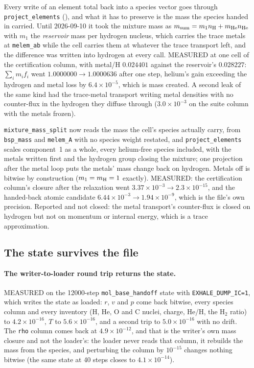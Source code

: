 \documentclass[english,a4paper]{my_memo}
\begin{document}
Every write of an element total back into a species vector goes through
\verb|project_elements| (), and what it
has to preserve is the mass the species handed in carried. Until 2026-09-10
it took the mixture mass as
$m_{\rm sum} = m_1 n_{\rm H} + m_{\rm He} n_{\rm He}$ with $m_1$ the
\emph{reservoir} mass per hydrogen nucleus, which carries the trace metals
at \verb|melem_ab| while the cell carries them at whatever the trace
transport left, and the difference was written into hydrogen at every call.
MEASURED at one cell of the certification column, with metal/H $0.024401$
against the reservoir's $0.028227$: $\sum_i m_i f_i$ went
$1.0000000 \to 1.0000636$ after one step, helium's gain exceeding the
hydrogen and metal loss by $6.4\times10^{-5}$, which is mass created. A
second leak of the same kind had the trace-metal transport writing metal densities
with no counter-flux in the hydrogen they diffuse through
($3.0\times10^{-3}$ on the suite column with the metals frozen).

\verb|mixture_mass_split| now reads the mass the cell's species actually
carry, from \verb|bsp_mass| and \verb|melem_A| with no species weight
restated, and \verb|project_elements| scales component~1 as a whole, every
helium-free species included, with the metals written first and the hydrogen
group closing the mixture; one projection after the metal loop puts the
metals' mass change back on hydrogen. Metals off is bitwise by construction
($m_1 = m_{\rm H} = 1$ exactly). MEASURED: the certification column's
closure after the relaxation went $3.37\times10^{-3} \to 2.3\times10^{-15}$,
and the handed-back atomic candidate $6.44\times10^{-3} \to
1.94\times10^{-9}$, which is the file's own precision. Reported and not
closed: the metal transport's counter-flux is closed on hydrogen but not on
momentum or internal energy, which is a trace approximation.

\subsection{The state survives the file}

\paragraph{The writer-to-loader round trip returns the state.} MEASURED on
the 12000-step \verb|mol_base_handoff| state with \verb|EXHALE_DUMP_IC=1|,
which writes the state as loaded: $r$, $v$ and $p$ come back bitwise, every
species column and every inventory (H, He, O and C nuclei, charge, He/H, the
H$_2$ ratio) to $4.2\times10^{-16}$, $T$ to $5.6\times10^{-16}$, and a second
trip to $5.0\times10^{-16}$ with no drift. The \verb|rho| column comes back
at $4.9\times10^{-12}$, and that is the writer's own mass closure and not the
loader's: the loader never reads that column, it rebuilds the mass from the
species, and perturbing the column by $10^{-15}$ changes nothing bitwise
(the same state at 40 steps closes to $4.1\times10^{-14}$).
\end{document}

